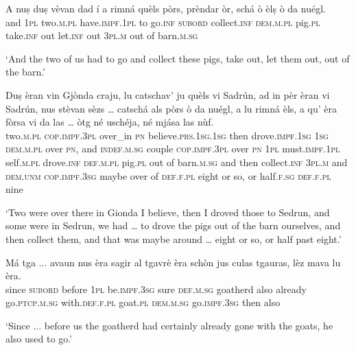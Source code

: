 \begin{linenumbers}
	\gll    A nuṣ duṣ vèvan dad í a rimná quèls pòrs, prèndar òr, schá ò èlṣ ò da nuégl.\\
	and \textsc{1pl} two.\textsc{m.pl} have.\textsc{impf.1pl} to go.\textsc{inf}  \textsc{subord} collect.\textsc{inf} \textsc{dem.m.pl} pig.\textsc{pl} take.\textsc{inf} out  let.\textsc{inf} out \textsc{3pl.m} out of barn.\textsc{m.sg}\\
\end{linenumbers}
\medskip
\glt `And the two of us had to go and collect these pigs, take out, let them out, out of the barn.'
\medskip

\begin{linenumbers}
	\gll    Duṣ èran vin Gjònda craju, lu catschav' ju  quèls vi Sadrún, ad in pèr èran vi Sadrún, nus stèvan sèzs … catschá als pòrs ò da nuégl, a lu rimná èls, a qu’ èra fòrsa vi da las … òtg né uschéja, né mjása las nùf.\\
	two.\textsc{m.pl} \textsc{cop.impf.3pl} over\_in \textsc{pn} believe.\textsc{prs.1sg.1sg}  then drove.\textsc{impf.1sg} \textsc{1sg} \textsc{dem.m.pl} over  \textsc{pn}, and \textsc{indef.m.sg} couple \textsc{cop.impf.3pl} over \textsc{pn} \textsc{1pl} must.\textsc{impf.1pl} self.\textsc{m.pl} {} drove.\textsc{inf} \textsc{def.m.pl} pig.\textsc{pl} out of barn.\textsc{m.sg} and then collect.\textsc{inf} \textsc{3pl.m} and \textsc{dem.unm} \textsc{cop.impf.3sg} maybe over of \textsc{def.f.pl} {} eight or so, or half.\textsc{f.sg} \textsc{def.f.pl} nine\\
\end{linenumbers}
\medskip
\glt `Two were over there in Gionda I believe, then I droved those to Sedrun, and some were in Sedrun, we had … to drove the pigs out of the barn ourselves, and then collect them, and that was maybe around … eight or so, or half past eight.'
\medskip

\begin{linenumbers}
	\gll  Má tga ... avaun nus èra sagir al tgavrè èra schòn jus culas tgauras, lèz mava lu èra.\\
	since \textsc{subord} {} before \textsc{1pl} be.\textsc{impf.3sg} sure \textsc{def.m.sg} goatherd also already go.\textsc{ptcp.m.sg} with.\textsc{def.f.pl} goat.\textsc{pl} \textsc{dem.m.sg} go.\textsc{impf.3sg} then also\\
\end{linenumbers}
\medskip
\glt `Since ... before us the goatherd had certainly already gone with the goats, he also used to go.'
\medskip

